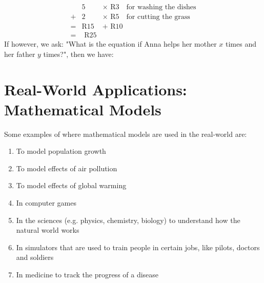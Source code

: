 \begin{eqnarray*}
&5 &\times \mbox{ R}3 \quad \mbox{for washing the dishes}\\
+&2 &\times \mbox{ R}5 \quad \mbox{for cutting the grass}\\
=& \mbox{R}15&+\mbox{ R}10\\
=& \mbox{ R}25
\end{eqnarray*}
If however, we ask: "What is the equation if Anna helps her mother $x$ times and her father $y$ times?", then we have:


\section{Real-World Applications: Mathematical Models}
Some examples of where mathematical models are used in the real-world are:

\begin{enumerate}
\item{To model population growth}
\item{To model effects of air pollution}
\item{To model effects of global warming}
\item{In computer games}
\item{In the sciences (e.g. physics, chemistry, biology) to understand how the natural world works}
\item{In simulators that are used to train people in certain jobs, like pilots, doctors and soldiers}
\item{In medicine to track the progress of a disease}
\end{enumerate}

